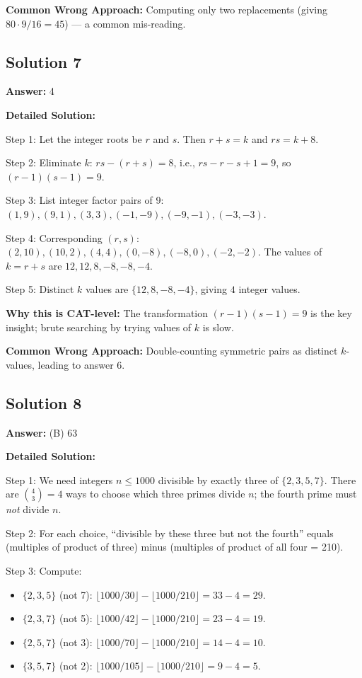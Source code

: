 \documentclass[11pt]{article}
\begin{document}
\textbf{Common Wrong Approach:} Computing only two replacements (giving \(80 \cdot 9/16 = 45\)) — a common mis-reading.

\subsection*{Solution 7}
\textbf{Answer:} 4

\textbf{Detailed Solution:}

Step 1: Let the integer roots be \(r\) and \(s\). Then \(r+s = k\) and \(rs = k+8\).

Step 2: Eliminate \(k\): \(rs - (r+s) = 8\), i.e., \(rs - r - s + 1 = 9\), so \((r-1)(s-1) = 9\).

Step 3: List integer factor pairs of 9: \((1,9), (9,1), (3,3), (-1,-9), (-9,-1), (-3,-3)\).

Step 4: Corresponding \((r,s)\): \((2,10), (10,2), (4,4), (0,-8), (-8,0), (-2,-2)\). The values of \(k = r+s\) are \(12, 12, 8, -8, -8, -4\).

Step 5: Distinct \(k\) values are \(\{12, 8, -8, -4\}\), giving \(\boxed{4}\) integer values.

\textbf{Why this is CAT-level:} The transformation \((r-1)(s-1)=9\) is the key insight; brute searching by trying values of \(k\) is slow.

\textbf{Common Wrong Approach:} Double-counting symmetric pairs as distinct \(k\)-values, leading to answer 6.

\subsection*{Solution 8}
\textbf{Answer:} (B) 63

\textbf{Detailed Solution:}

Step 1: We need integers \(n \le 1000\) divisible by exactly three of \(\{2,3,5,7\}\). There are \(\binom{4}{3} = 4\) ways to choose which three primes divide \(n\); the fourth prime must \emph{not} divide \(n\).

Step 2: For each choice, ``divisible by these three but not the fourth'' equals (multiples of product of three) minus (multiples of product of all four = 210).

Step 3: Compute:
\begin{itemize}
  \item \(\{2,3,5\}\) (not 7): \(\lfloor 1000/30\rfloor - \lfloor 1000/210\rfloor = 33 - 4 = 29\).
  \item \(\{2,3,7\}\) (not 5): \(\lfloor 1000/42\rfloor - \lfloor 1000/210\rfloor = 23 - 4 = 19\).
  \item \(\{2,5,7\}\) (not 3): \(\lfloor 1000/70\rfloor - \lfloor 1000/210\rfloor = 14 - 4 = 10\).
  \item \(\{3,5,7\}\) (not 2): \(\lfloor 1000/105\rfloor - \lfloor 1000/210\rfloor = 9 - 4 = 5\).
\end{itemize}
\end{document}
